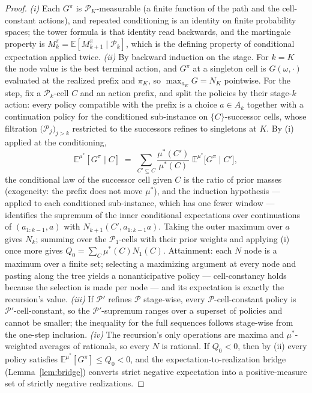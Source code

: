 \documentclass[10pt,twocolumn]{article}
\theoremstyle{definition}
\begin{document}
\begin{proof}
\emph{(i)} Each $G^{\pi}$ is $\mathcal{P}_{K}$-measurable (a finite
function of the path and the cell-constant actions), and repeated
conditioning is an identity on finite probability spaces; the tower
formula is that identity read backwards, and the martingale property is
$M^{\pi}_{k} = \mathbb{E}[M^{\pi}_{k+1} \mid \mathcal{P}_{k}]$, which
is the defining property of conditional expectation applied twice.
\emph{(ii)} By backward induction on the stage. For $k = K$ the node
value is the best terminal action, and $G^{\pi}$ at a singleton cell is
$G(\omega, \cdot)$ evaluated at the realized prefix and $\pi_{K}$, so
$\max_{a_{K}} G = N_{K}$ pointwise. For the step, fix a
$\mathcal{P}_{k}$-cell $C$ and an action prefix, and split the policies
by their stage-$k$ action: every policy compatible with the prefix is a
choice $a \in A_{k}$ together with a continuation policy for the
conditioned sub-instance on $\{C\}$-successor cells, whose filtration
$\bigl(\mathcal{P}_{j}\bigr)_{j > k}$ restricted to the successors
refines to singletons at $K$. By (i) applied at the conditioning,
\[
\mathbb{E}^{\mu^{*}}[G^{\pi} \mid C] \;=\;
\sum_{C' \subseteq C} \frac{\mu^{*}(C')}{\mu^{*}(C)}\;
\mathbb{E}^{\mu^{*}}\bigl[G^{\pi} \mid C'\bigr],
\]
the conditional law of the successor cell given $C$ is the ratio of
prior masses (exogeneity: the prefix does not move $\mu^{*}$), and the
induction hypothesis --- applied to each conditioned sub-instance,
which has one fewer window --- identifies the supremum of the inner
conditional expectations over continuations of $(a_{1:k-1}, a)$ with
$N_{k+1}(C', a_{1:k-1}a)$. Taking the outer maximum over $a$ gives
$N_{k}$; summing over the $\mathcal{P}_{1}$-cells with their prior
weights and applying (i) once more gives $Q_{0} = \sum_{C}
\mu^{*}(C) N_{1}(C)$. Attainment: each $N$ node is a maximum over a
finite set; selecting a maximizing argument at every node and pasting
along the tree yields a nonanticipative policy --- cell-constancy holds
because the selection is made per node --- and its expectation is
exactly the recursion's value. \emph{(iii)} If $\mathcal{P}'$ refines
$\mathcal{P}$ stage-wise, every $\mathcal{P}$-cell-constant policy is
$\mathcal{P}'$-cell-constant, so the $\mathcal{P}'$-supremum ranges
over a superset of policies and cannot be smaller; the inequality for
the full sequences follows stage-wise from the one-step inclusion.
\emph{(iv)} The recursion's only operations are maxima and
$\mu^{*}$-weighted averages of rationals, so every $N$ is rational. If
$Q_{0} < 0$, then by (ii) every policy satisfies
$\mathbb{E}^{\mu^{*}}[G^{\pi}] \le Q_{0} < 0$, and the
expectation-to-realization bridge (Lemma~\ref{lem:bridge}) converts strict negative expectation into a
positive-measure set of strictly negative realizations.
\end{proof}
\end{document}
